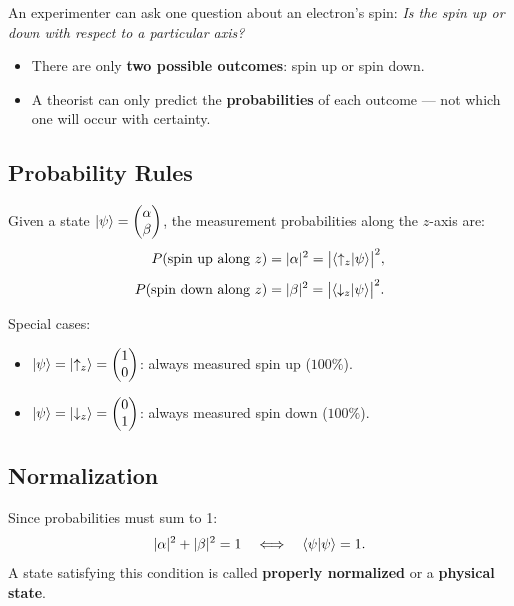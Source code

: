 \documentclass[11pt,a4paper]{article}
\theoremstyle{definition}
\theoremstyle{plain}
\theoremstyle{remark}
\begin{document}
An experimenter can ask one question about an electron's spin: \emph{Is the spin up or down with respect to a particular axis?}

\begin{itemize}
    \item There are only \textbf{two possible outcomes}: spin up or spin down.
    \item A theorist can only predict the \textbf{probabilities} of each outcome --- not which one will occur with certainty.
\end{itemize}

\subsection{Probability Rules}

Given a state $\ket{\psi} = \begin{pmatrix} \alpha \\ \beta \end{pmatrix}$, the measurement probabilities along the $z$-axis are:
\begin{align}
    P(\text{spin up along } z) &= |\alpha|^2 = \bigl|\braket{\uparrow_z}{\psi}\bigr|^2, \\[4pt]
    P(\text{spin down along } z) &= |\beta|^2 = \bigl|\braket{\downarrow_z}{\psi}\bigr|^2.
\end{align}

Special cases:
\begin{itemize}
    \item $\ket{\psi} = \ket{\uparrow_z} = \begin{pmatrix}1\\0\end{pmatrix}$: always measured spin up ($100\%$).
    \item $\ket{\psi} = \ket{\downarrow_z} = \begin{pmatrix}0\\1\end{pmatrix}$: always measured spin down ($100\%$).
\end{itemize}

\subsection{Normalization}

Since probabilities must sum to 1:
\[
    |\alpha|^2 + |\beta|^2 = 1 \quad \Longleftrightarrow \quad \braket{\psi}{\psi} = 1.
\]
A state satisfying this condition is called \textbf{properly normalized} or a \textbf{physical state}.
\end{document}
